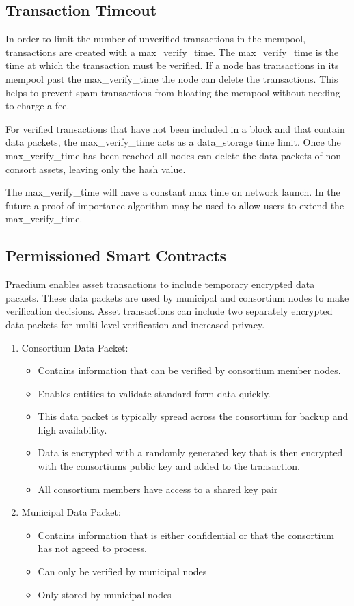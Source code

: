\documentclass[12pt]{article}
\begin{document}
\subsection{Transaction Timeout}


In order to limit the number of unverified transactions in the mempool, 
transactions are created with a max\_verify\_time.  The max\_verify\_time
is the time at which the transaction must be verified.  If a node has 
transactions in its mempool past the max\_verify\_time the node can delete 
the transactions.  This helps to prevent spam transactions from bloating the 
mempool without needing to charge a fee.

For verified transactions 
that have not been included in a block and that contain data packets, the max\_verify\_time
acts as a data\_storage time limit.  Once the max\_verify\_time has been reached all nodes 
can delete the data packets of non-consort assets, leaving only the hash value.

The max\_verify\_time will have a constant max time on network launch.  
In the future a proof of importance algorithm may be used to 
allow users to extend the max\_verify\_time.


\subsection{Permissioned Smart Contracts}

Praedium enables asset transactions to include temporary encrypted data packets. These data
packets are used by municipal and consortium nodes to make verification decisions.  Asset transactions
can include two separately encrypted data packets for multi level verification and increased privacy.

\begin{enumerate}
	\item Consortium Data Packet:
		\begin{itemize}
			\item{Contains information that can be verified by consortium member
				nodes.}
			\item{Enables entities to validate standard form data quickly.} 
			\item{This data packet is typically spread across the consortium for backup
				and high availability.}
			\item{Data is encrypted with a randomly generated key that is then encrypted
				with the consortiums public key and added to the transaction.}
			\item{All consortium members have access to a shared key pair}	
		\end{itemize}
	\item Municipal Data Packet:
		\begin{itemize}
			\item{Contains information that is either confidential or that the
				consortium has not agreed to process.}
			\item{Can only be verified by municipal nodes}
			\item{Only stored by municipal nodes}
		\end{itemize}
\end{enumerate}
\end{document}
